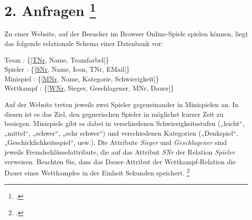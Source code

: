\documentclass{lehramt-informatik-aufgabe}
\begin{document}

\section{2. Anfragen
\footcite[Thema 1 Teilaufgabe 2 Aufgabe 2]{examen:46116:2013:03}
}

Zu einer Website, auf der Besucher im Browser Online-Spiele spielen
können, liegt das folgende relationale Schema einer Datenbank vor:

\bigskip

{
\ttfamily
\noindent
Team : \{[\underline{TNr}, Name, Teamfarbel]\}\\
Spieler : \{[\underline{SNr}, Name, Icon, TNr, EMail]\}\\
Minispiel : \{[\underline{MNr}, Name, Kategorie, Schwierigkeit]\}\\
Wettkampf : \{[\underline{WNr}, Sieger, Geschlagener, MNr, Dauer]\}\\
}

\bigskip

Auf der Website treten jeweils zwei Spieler gegeneinander in Minispielen
an. In diesen ist es das Ziel, den gegnerischen Spieler in möglichst
kurzer Zeit zu besiegen. Minispiele gibt es dabei in verschiedenen
Schwierigkeitsstufen („leicht“, „mittel“, „schwer“, „sehr schwer“) und
verschiedenen Kategorien („Denkspiel“, „Geschicklichkeitsspiel“, usw.).
Die Attribute \emph{Sieger} und \emph{Geschlagener} sind jeweils
Fremdschlüsselattribute, die auf das Attribut \emph{SNr} der Relation
\emph{Spieler} verweisen. Beachten Sie, dass das Dauer-Attribut der
Wettkampf-Relation die Dauer eines Wettkampfes in der Einheit Sekunden
speichert.
\footcite{db:ab:examen-rs-2013-03}
\end{document}
